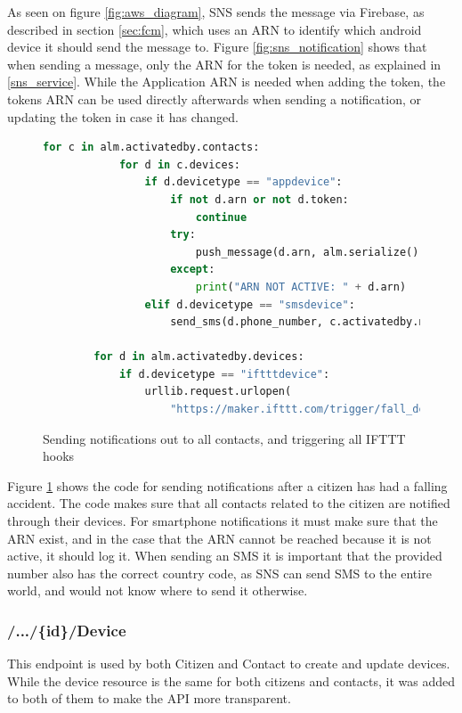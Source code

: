 As seen on figure \ref{fig:aws_diagram}, SNS sends the message via Firebase, as described in section \ref{sec:fcm}, which uses an ARN to identify which android device it should send the message to. Figure \ref{fig:sns_notification} shows that when sending a message, only the ARN for the token is needed, as explained in \ref{sns_service}. While the Application ARN is needed when adding the token, the tokens ARN can be used directly afterwards when sending a notification, or updating the token in case it has changed.

\begin{figure}[H]
    \centering
    \begin{lstlisting}[language=Python]
        for c in alm.activatedby.contacts:
            for d in c.devices:
                if d.devicetype == "appdevice":
                    if not d.arn or not d.token:
                        continue
                    try:
                        push_message(d.arn, alm.serialize())
                    except:
                        print("ARN NOT ACTIVE: " + d.arn)
                elif d.devicetype == "smsdevice":
                    send_sms(d.phone_number, c.activatedby.name + " has had an falling accident, and requests help.")

        for d in alm.activatedby.devices:
            if d.devicetype == "iftttdevice":
                urllib.request.urlopen(
                    "https://maker.ifttt.com/trigger/fall_detected/with/key/" + d.token).read()
    \end{lstlisting}
    \caption{Sending notifications out to all contacts, and triggering all IFTTT hooks}
    \label{fig:notify_contacts}
\end{figure}

Figure \ref{fig:notify_contacts} shows the code for sending notifications after a citizen has had a falling accident. The code makes sure that all contacts related to the citizen are notified through their devices. For smartphone notifications it must make sure that the ARN exist, and in the case that the ARN cannot be reached because it is not active, it should log it. When sending an SMS it is important that the provided number also has the correct country code, as SNS can send SMS to the entire world, and would not know where to send it otherwise.

\subsubsection{/.../\{id\}/Device}
This endpoint is used by both Citizen and Contact to create and update devices. While the device resource is the same for both citizens and contacts, it was added to both of them to make the API more transparent.


